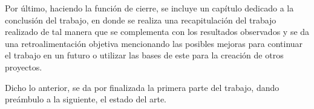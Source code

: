 Por último, haciendo la función de cierre, se incluye un capítulo dedicado a la conclusión del trabajo, en donde se realiza una recapitulación del trabajo realizado de tal manera que se complementa con los resultados observados y se da una retroalimentación objetiva mencionando las posibles mejoras para continuar el trabajo en un futuro o utilizar las bases de este para la creación de otros proyectos.

Dicho lo anterior, se da por finalizada la primera parte del trabajo, dando preámbulo a la siguiente, el estado del arte.